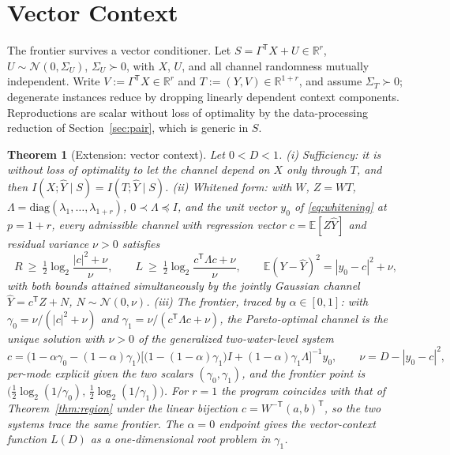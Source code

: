 ﻿\documentclass[11pt,onecolumn]{IEEEtran}
\newtheorem{theorem}{Theorem}
\newcommand{\E}{\mathbb{E}}
\newcommand{\R}{\mathbb{R}}
\newcommand{\hY}{\widehat{Y}}
\begin{document}
\section{Vector Context}
\label{sec:vector}

The frontier survives a vector conditioner. Let
$S=\Gamma^{\mathsf T}X+U\in\R^r$, $U\sim\mathcal N(0,\Sigma_U)$,
$\Sigma_U\succ0$, with $X$, $U$, and all channel randomness mutually
independent. Write $V:=\Gamma^{\mathsf T}X\in\R^r$ and
$T:=(Y,V)\in\R^{1+r}$, and assume $\Sigma_T\succ0$; degenerate
instances reduce by dropping linearly dependent context components.
Reproductions are scalar without loss of optimality by the
data-processing reduction of Section~\ref{sec:pair}, which is generic
in $S$.

\begin{theorem}[Extension: vector context]\label{thm:vector}
Let $0<D<1$.
(i) \emph{Sufficiency:} it is without loss of optimality to let the
channel depend on $X$ only through $T$, and then
$I(X;\hY\mid S)=I(T;\hY\mid S)$.
(ii) \emph{Whitened form:} with $W$, $Z=WT$,
$\Lambda=\mathrm{diag}(\lambda_1,\dots,\lambda_{1+r})$,
$0\prec\Lambda\preceq I$, and the unit vector $y_0$ of
\eqref{eq:whitening} at $p=1+r$, every admissible channel with
regression vector $c=\E[Z\hY]$ and residual variance $\nu>0$ satisfies
\begin{equation}
R\ \ge\ \tfrac12\log_2\frac{|c|^2+\nu}{\nu},
\qquad
L\ \ge\ \tfrac12\log_2\frac{c^{\mathsf T}\Lambda c+\nu}{\nu},
\qquad
\E(Y-\hY)^2=|y_0-c|^2+\nu,
\label{eq:vec-bounds}
\end{equation}
with both bounds attained simultaneously by the jointly Gaussian
channel $\hY=c^{\mathsf T}Z+N$, $N\sim\mathcal N(0,\nu)$.
(iii) \emph{The frontier}, traced by $\alpha\in[0,1]$: with
$\gamma_0=\nu/(|c|^2+\nu)$ and
$\gamma_1=\nu/(c^{\mathsf T}\Lambda c+\nu)$, the Pareto-optimal channel is
the unique solution with $\nu>0$ of the generalized two-water-level
system
\begin{equation}
c=\bigl(1-\alpha\gamma_0-(1-\alpha)\gamma_1\bigr)
\bigl[\bigl(1-(1-\alpha)\gamma_1\bigr)I
+(1-\alpha)\gamma_1\Lambda\bigr]^{-1}y_0,
\qquad
\nu=D-|y_0-c|^2,
\label{eq:vecfoc}
\end{equation}
per-mode explicit given the two scalars $(\gamma_0,\gamma_1)$, and the
frontier point is
$\bigl(\tfrac12\log_2(1/\gamma_0),\,\tfrac12\log_2(1/\gamma_1)\bigr)$.
For $r=1$ the program coincides with that of Theorem~\ref{thm:region}
under the linear bijection $c=W^{-\mathsf T}(a,b)^{\mathsf T}$, so the
two systems trace the same frontier. The $\alpha=0$ endpoint gives the
vector-context function $L(D)$ as a one-dimensional root problem in
$\gamma_1$.
\end{theorem}
\end{document}
